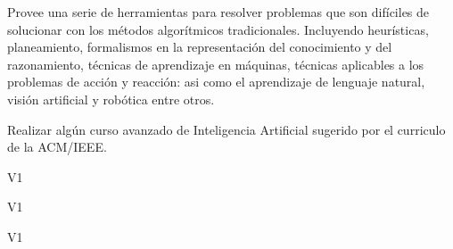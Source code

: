 \begin{syllabus}


\begin{justification}
Provee una serie de herramientas para resolver problemas que son difíciles de solucionar con los métodos algorítmicos tradicionales. Incluyendo heurísticas, planeamiento, formalismos en la representación del conocimiento y del razonamiento, técnicas de aprendizaje en máquinas, técnicas aplicables a los problemas de acción y reacción: asi como el aprendizaje de lenguaje natural, visión artificial y robótica entre otros. 
\end{justification}

\begin{goals}
\item Realizar algún curso avanzado de Inteligencia Artificial sugerido por el curriculo de la ACM/IEEE.
\end{goals}

\begin{outcomes}{V1}
    \item {}
    \item {}
\end{outcomes}

\begin{specificoutcomes}{V1} 
    \item {}
    \item {}
    \item {}
    \item {}
    \item {}
    \item {}
\end{specificoutcomes}

\begin{competences}{V1}
\item {} 
\item {} 
\item {}
\end{competences}


\end{syllabus}
